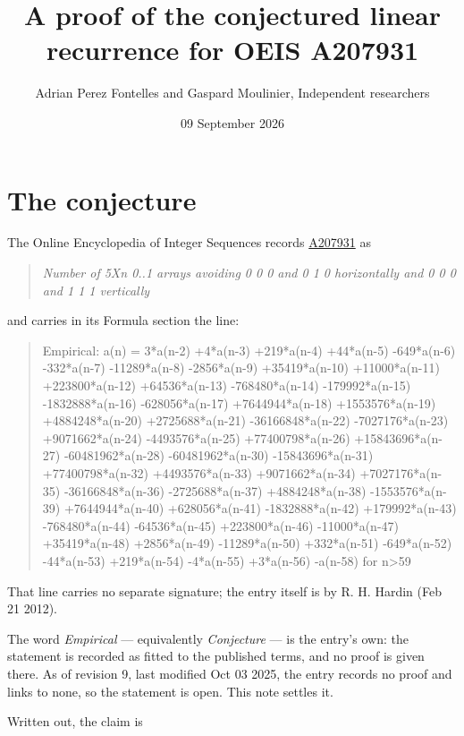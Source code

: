 \documentclass[11pt]{article}
\title{A proof of the conjectured linear recurrence for OEIS A207931}
\author{Adrian Perez Fontelles and Gaspard Moulinier, Independent researchers}
\date{09 September 2026}
\theoremstyle{definition}
\begin{document}
\maketitle
\section{The conjecture}

The Online Encyclopedia of Integer Sequences records \href{https://oeis.org/A207931}{A207931} as

\begin{quote}\itshape Number of 5Xn 0..1 arrays avoiding 0 0 0 and 0 1 0 horizontally and 0 0 0 and 1 1 1 vertically\end{quote}

and carries in its Formula section the line:

\begin{quote}\ttfamily Empirical: a(n) = 3*a(n-2) +4*a(n-3) +219*a(n-4) +44*a(n-5) -649*a(n-6) -332*a(n-7) -11289*a(n-8) -2856*a(n-9) +35419*a(n-10) +11000*a(n-11) +223800*a(n-12) +64536*a(n-13) -768480*a(n-14) -179992*a(n-15) -1832888*a(n-16) -628056*a(n-17) +7644944*a(n-18) +1553576*a(n-19) +4884248*a(n-20) +2725688*a(n-21) -36166848*a(n-22) -7027176*a(n-23) +9071662*a(n-24) -4493576*a(n-25) +77400798*a(n-26) +15843696*a(n-27) -60481962*a(n-28) -60481962*a(n-30) -15843696*a(n-31) +77400798*a(n-32) +4493576*a(n-33) +9071662*a(n-34) +7027176*a(n-35) -36166848*a(n-36) -2725688*a(n-37) +4884248*a(n-38) -1553576*a(n-39) +7644944*a(n-40) +628056*a(n-41) -1832888*a(n-42) +179992*a(n-43) -768480*a(n-44) -64536*a(n-45) +223800*a(n-46) -11000*a(n-47) +35419*a(n-48) +2856*a(n-49) -11289*a(n-50) +332*a(n-51) -649*a(n-52) -44*a(n-53) +219*a(n-54) -4*a(n-55) +3*a(n-56) -a(n-58) for n>59\end{quote}

That line carries no separate signature; the entry itself is by R. H. Hardin (Feb 21 2012).

The word {\itshape Empirical} --- equivalently {\itshape Conjecture} --- is the entry's own: the statement is recorded as fitted to the published terms, and no proof is given there. As of revision 9, last modified Oct 03 2025, the entry records no proof and links to none, so the statement is open. This note settles it.

Written out, the claim is
\end{document}
